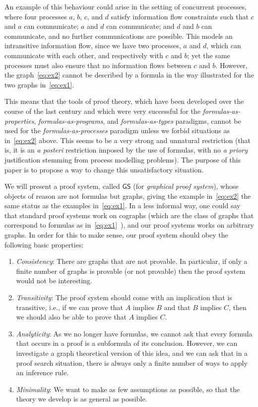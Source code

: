 \documentclass{lmcs} %
\def\GS{\mathsf{GS}}
\theoremstyle{plain}
\begin{document}
An example of this behaviour could arise in the setting of concurrent processes, where four processes $a$, $b$, $c$, and $d$ 
 satisfy information flow constraints such that
$c$ and $a$ can communicate;
$a$ and $d$ can communicate; and
$d$ and $b$ can communicate,
and no further communications are possible.
This models an intransitive information flow,
since we have two processes, $a$ and $d$, which can communicate with each other, and respectively with $c$ and $b$;
yet the same processes must also ensure that no information flows between $c$ and $b$.
However, the graph~\eqref{eq:ex2} cannot be described by a formula in the way illustrated for 
the two graphs in~\eqref{eq:ex1}.




This means that the tools of
proof theory, which have been developed over the course of the last
century and which were very successful for the
\emph{formulas-as-properties}, \emph{formulas-as-programs}, and
\emph{formulas-as-types} paradigms, cannot be used for the
\emph{formulas-as-processes} paradigm unless we forbid situations as
in~\eqref{eq:ex2} above. This seems to be a very strong
and unnatural restriction (that is, it is an \textit{a posteri} restriction imposed by the use of formulas, with no \textit{a priory} justification stemming from process modelling problems). The purpose of this paper is to propose
a way to change this unsatisfactory situation.


We will present a proof system, called $\GS$ (for \emph{graphical
 proof system}), whose objects of reason are not formulas but graphs,
giving the example in~\eqref{eq:ex2} the same status as the examples in~\eqref{eq:ex1}.
In a less informal way, one could say that standard
proof systems work on cographs (which are the class of graphs that
correspond to formulas as in~\eqref{eq:ex1}~\cite{duffin:65}), and our proof systems works
on arbitrary graphs.  In order for this to make sense, our proof
system should obey the following basic properties:

\begin{enumerate}
\item\label{intro:prop1}
 \emph{Consistency}: There are graphs that are not provable.
 In particular, if only a finite number of graphs is provable (or not provable) then the proof system would not be interesting.
\item\label{intro:prop2}
 \emph{Transitivity}: The proof
  system should come with an implication that is transitive, i.e., if
  we can prove that $A$ implies $B$ and that $B$ implies $C$, then we
  should also be able to prove that $A$ implies $C$.
\item\label{intro:prop3}
 \emph{Analyticity}: As we no longer have formulas, we cannot ask
  that every formula that occurs in a proof is a subformula of its
  conclusion. However, we can investigate a graph theoretical version of this idea, and we can ask that in a proof search situation, there
  is always only a finite number of ways 
  to apply an
  inference rule.
\item\label{intro:prop4}
 \emph{Minimality}: We want to make as few assumptions as
  possible, 
  so that the theory we develop is as general as possible.
\end{enumerate}
\end{document}
